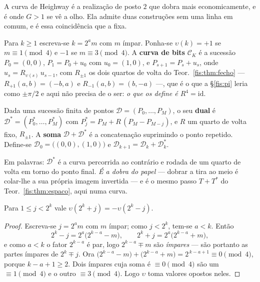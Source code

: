\documentclass[livro.tex]{subfiles}
\begin{document}
\noindent A curva de Heighway é a realização de posto $2$ que dobra mais
economicamente, e é onde $G>1$ se vê a olho. Ela admite duas construções sem uma
linha em comum, e é essa coincidência que a fixa.

\begin{definicao}\label{fis:def:bits}
Para $k\ge1$ escreva-se $k=2^{a}m$ com $m$ ímpar. Ponha-se $\upsilon(k)=+1$ se
$m\equiv1\pmod 4$ e $-1$ se $m\equiv3\pmod 4$. A \textbf{curva de bits}
$\mathcal{C}_K$ é a sucessão $P_0=(0,0)$, $P_1=P_0+u_0$ com $u_0=(1,0)$, e
$P_{s+1}=P_s+u_s$, onde $u_{s}=R_{\upsilon(s)}\,u_{s-1}$, com $R_{\pm1}$ os dois
quartos de volta do Teor.~\ref{fis:thm:fecho} --- $R_{+1}(a,b)=(-b,a)$ e
$R_{-1}(a,b)=(b,-a)$ ---, que é o que a §\ref{fis:pi} leria como $\pm\pi/2$ e
aqui não precisa de o ser: \emph{o que os define é $R^{4}=\mathrm{id}$}.
\end{definicao}

\begin{definicao}[a dobra]\label{fis:def:dobrar}
Dada uma sucessão finita de pontos $\mathcal{D}=(P_0,\dots,P_M)$, o seu
\textbf{dual} é $\mathcal{D}^{*}=(P^{*}_0,\dots,P^{*}_M)$ com
$P^{*}_j=P_M+R\,(P_M-P_{M-j})$, e $R$ um quarto de volta fixo, $R_{\pm1}$. A
\textbf{soma} $\mathcal{D}+\mathcal{D}^{*}$ é a concatenação suprimindo o ponto
repetido. Define-se $\mathcal{D}_0=\bigl((0,0),(1,0)\bigr)$ e
$\mathcal{D}_{k+1}=\mathcal{D}_k+\mathcal{D}_k^{*}$.
\end{definicao}

\noindent Em palavras: $\mathcal{D}^{*}$ é a curva percorrida ao contrário e
rodada de um quarto de volta em torno do ponto final. \emph{É a dobra do papel} ---
dobrar a tira ao meio é colar-lhe a sua própria imagem invertida --- e é o mesmo
passo $T+T^{*}$ do Teor.~\ref{fis:thm:espaco}, aqui numa curva.

\begin{lema}\label{fis:lem:anti}
Para $1\le j<2^{k}$ vale $\upsilon(2^{k}+j)=-\upsilon(2^{k}-j)$.
\end{lema}

\begin{proof}
Escreva-se $j=2^{a}m$ com $m$ ímpar; como $j<2^{k}$, tem-se $a<k$. Então
\[
2^{k}-j=2^{a}\bigl(2^{k-a}-m\bigr),\qquad
2^{k}+j=2^{a}\bigl(2^{k-a}+m\bigr),
\]
e como $a<k$ o fator $2^{k-a}$ é par, logo $2^{k-a}\mp m$ são \emph{ímpares} ---
são portanto as partes ímpares de $2^{k}\mp j$. Ora
$\bigl(2^{k-a}-m\bigr)+\bigl(2^{k-a}+m\bigr)=2^{\,k-a+1}\equiv0\pmod 4$, porque
$k-a+1\ge2$. Dois ímpares cuja soma é $\equiv0\pmod4$ são um $\equiv1\pmod4$ e o outro
$\equiv3\pmod4$. Logo $\upsilon$ toma valores opostos neles.
\end{proof}
\end{document}
